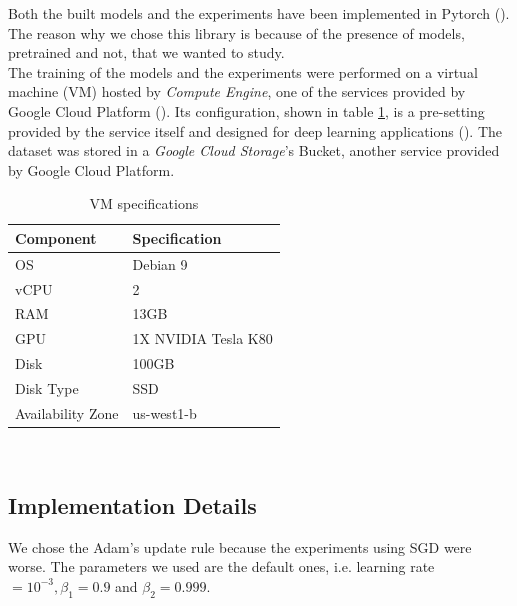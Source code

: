 \documentclass{article}
\begin{document}
Both the built models and the experiments have been implemented in Pytorch (\cite{pytorch}). The reason why we chose this library is because of the presence of models, pretrained and not, that we wanted to study.\\
The training of the models and the experiments were performed on a virtual machine (VM) hosted by \textit{Compute Engine}, one of the services provided by Google Cloud Platform (\cite{gcloud}). Its configuration, shown in table \ref{table:specVM}, is a pre-setting provided by the service itself and designed for deep learning applications  (\cite{vmconfig}). The dataset was stored in a \textit{Google Cloud Storage}'s Bucket, another service provided by Google Cloud Platform.

\begin{table}
	\centering
	\begin{tabular}{|l|l|} 
		\hline
		\textbf{Component} & \textbf{Specification}  \\ 
		\hline
		OS                 & Debian 9                \\
		vCPU               & 2                       \\
		RAM                & 13GB                    \\
		GPU                & 1X NVIDIA Tesla K80     \\
		Disk               & 100GB                   \\
		Disk Type          & SSD                     \\
		Availability Zone  & us-west1-b              \\
		\hline
	\end{tabular}
\\
\caption{VM specifications}
   	\label{table:specVM}
\end{table}

\subsection{Implementation Details}

We chose the Adam's update rule because the experiments using SGD were worse. The parameters we used are the default ones, i.e. learning rate $= 10^{-3}, \beta_{1}  = 0.9$ and $\beta_{2} = 0.999$. \\
\end{document}
